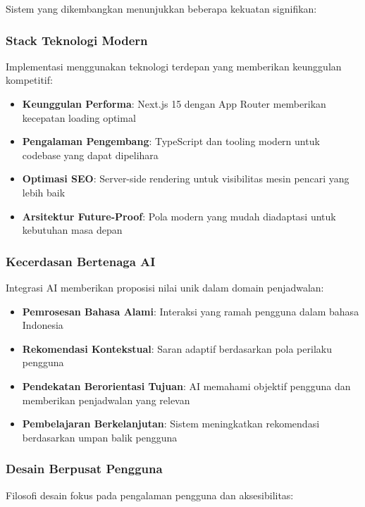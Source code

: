 Sistem yang dikembangkan menunjukkan beberapa kekuatan signifikan:

\subsubsection{Stack Teknologi Modern}

Implementasi menggunakan teknologi terdepan yang memberikan keunggulan kompetitif:

\begin{itemize}
\item \textbf{Keunggulan Performa}: Next.js 15 dengan App Router memberikan kecepatan loading optimal
\item \textbf{Pengalaman Pengembang}: TypeScript dan tooling modern untuk codebase yang dapat dipelihara
\item \textbf{Optimasi SEO}: Server-side rendering untuk visibilitas mesin pencari yang lebih baik
\item \textbf{Arsitektur Future-Proof}: Pola modern yang mudah diadaptasi untuk kebutuhan masa depan
\end{itemize}

\subsubsection{Kecerdasan Bertenaga AI}

Integrasi AI memberikan proposisi nilai unik dalam domain penjadwalan:

\begin{itemize}
\item \textbf{Pemrosesan Bahasa Alami}: Interaksi yang ramah pengguna dalam bahasa Indonesia
\item \textbf{Rekomendasi Kontekstual}: Saran adaptif berdasarkan pola perilaku pengguna
\item \textbf{Pendekatan Berorientasi Tujuan}: AI memahami objektif pengguna dan memberikan penjadwalan yang relevan
\item \textbf{Pembelajaran Berkelanjutan}: Sistem meningkatkan rekomendasi berdasarkan umpan balik pengguna
\end{itemize}

\subsubsection{Desain Berpusat Pengguna}

Filosofi desain fokus pada pengalaman pengguna dan aksesibilitas:


